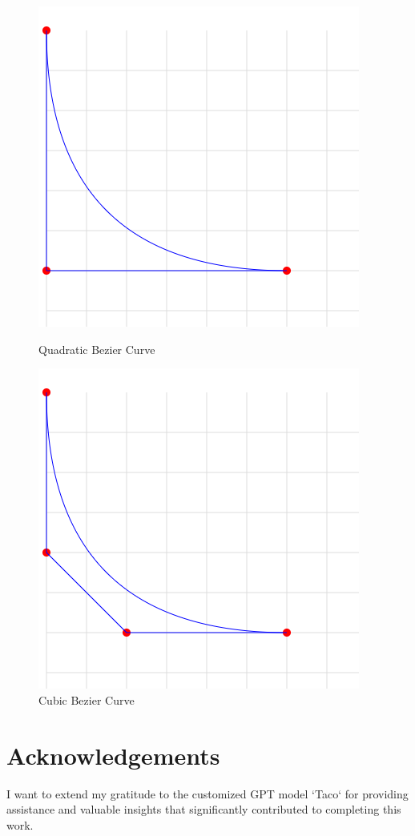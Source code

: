 \documentclass[notitlepage]{llncs}
\begin{document}
\begin{figure}[htbp]
  \centering
  \begin{minipage}[b]{0.4\textwidth}
    \includegraphics[width=\textwidth]{QuadraticBezierCurve.png}
    \caption{Quadratic Bezier Curve}
  \end{minipage}
  \hfill
  \begin{minipage}[b]{0.4\textwidth}
    \includegraphics[width=\textwidth]{CubicBezierCurve.png}
    \caption{Cubic Bezier Curve}
  \end{minipage}
\end{figure}



\newpage
\section*{Acknowledgements}
I want to extend my gratitude to the customized GPT model `Taco` for providing assistance and valuable insights that significantly contributed to completing this work.


\end{document}
